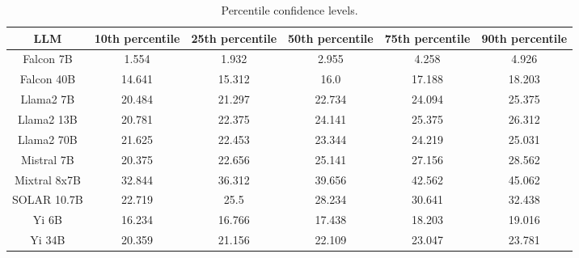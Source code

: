 \begin{table*}
\centering
\begin{tabular}{c|c|c|c|c|c}
LLM & 10th percentile & 25th percentile & 50th percentile & 75th percentile & 90th percentile\\ \hline
Falcon 7B & 1.554 & 1.932 & 2.955 & 4.258 & 4.926\\
Falcon 40B & 14.641 & 15.312 & 16.0 & 17.188 & 18.203\\
Llama2 7B & 20.484 & 21.297 & 22.734 & 24.094 & 25.375\\
Llama2 13B & 20.781 & 22.375 & 24.141 & 25.375 & 26.312\\
Llama2 70B & 21.625 & 22.453 & 23.344 & 24.219 & 25.031\\
Mistral 7B & 20.375 & 22.656 & 25.141 & 27.156 & 28.562\\
Mixtral 8x7B & 32.844 & 36.312 & 39.656 & 42.562 & 45.062\\
SOLAR 10.7B & 22.719 & 25.5 & 28.234 & 30.641 & 32.438\\
Yi 6B & 16.234 & 16.766 & 17.438 & 18.203 & 19.016\\
Yi 34B & 20.359 & 21.156 & 22.109 & 23.047 & 23.781\\
\hline
\end{tabular}
\caption{Percentile confidence levels.}
\label{tab:percentile_conf}
\end{table*}
